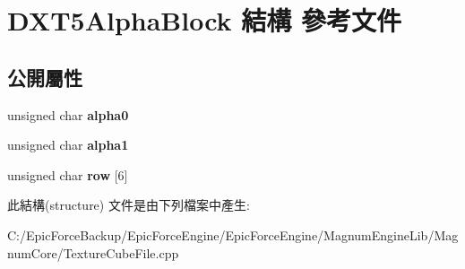 \hypertarget{struct_d_x_t5_alpha_block}{}\section{D\+X\+T5\+Alpha\+Block 結構 參考文件}
\label{struct_d_x_t5_alpha_block}
\subsection*{公開屬性}
\begin{DoxyCompactItemize}
\item 
unsigned char {\bfseries alpha0}\hypertarget{struct_d_x_t5_alpha_block_ab28d1a8933c139b0a5417ba76d470c43}{}\label{struct_d_x_t5_alpha_block_ab28d1a8933c139b0a5417ba76d470c43}

\item 
unsigned char {\bfseries alpha1}\hypertarget{struct_d_x_t5_alpha_block_ae53f3a96921af5bfe86e34f945faa229}{}\label{struct_d_x_t5_alpha_block_ae53f3a96921af5bfe86e34f945faa229}

\item 
unsigned char {\bfseries row} \mbox{[}6\mbox{]}\hypertarget{struct_d_x_t5_alpha_block_aed520432ec1a8937a606457febc08be5}{}\label{struct_d_x_t5_alpha_block_aed520432ec1a8937a606457febc08be5}

\end{DoxyCompactItemize}


此結構(structure) 文件是由下列檔案中產生\+:\begin{DoxyCompactItemize}
\item 
C\+:/\+Epic\+Force\+Backup/\+Epic\+Force\+Engine/\+Epic\+Force\+Engine/\+Magnum\+Engine\+Lib/\+Magnum\+Core/Texture\+Cube\+File.\+cpp\end{DoxyCompactItemize}

